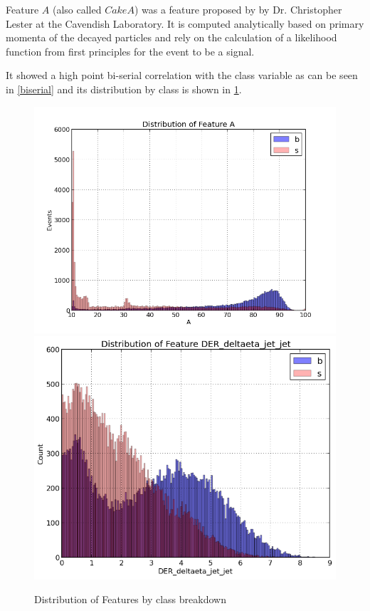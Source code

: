 \documentclass[final,3p,times,twocolumn]{elsarticle}
\begin{document}
Feature $A$ (also called $CakeA$) was a feature proposed by by Dr. Christopher Lester at the Cavendish Laboratory. It is computed analytically based on primary momenta of the decayed particles and rely on the calculation of a likelihood function from first principles for the event to be a signal.

It showed a high point bi-serial correlation with the class variable as can be seen in \ref{biserial} and its distribution by class is shown in \ref{dists_1}.

\begin{figure}
\hspace{-0.9cm}
\includegraphics[scale=0.5]{Images/A_dist.png}
\includegraphics[scale=0.5]{Images/DER_deltaeta_jet_jet_Hist.png}
\caption{Distribution of Features by class breakdown}
\label{dists_1}
\end{figure}
\end{document}
